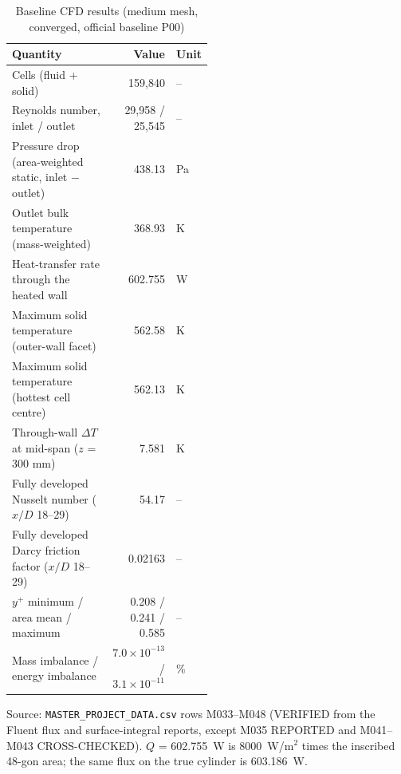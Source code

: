 \begin{table}[htbp]
\centering
\small
\caption{Baseline CFD results (medium mesh, converged, official baseline P00)}
\label{tab:cfdres}
\begin{tabular}{>{\raggedright\arraybackslash}p{0.50\linewidth}rl}
\toprule
Quantity & Value & Unit \\
\midrule
Cells (fluid + solid) & 159,840 & -- \\
Reynolds number, inlet / outlet & 29,958 / 25,545 & -- \\
Pressure drop (area-weighted static, inlet $-$ outlet) & 438.13 & Pa \\
Outlet bulk temperature (mass-weighted) & 368.93 & K \\
Heat-transfer rate through the heated wall & 602.755 & W \\
Maximum solid temperature (outer-wall facet) & 562.58 & K \\
Maximum solid temperature (hottest cell centre) & 562.13 & K \\
Through-wall $\Delta T$ at mid-span ($z$ = 300 mm) & 7.581 & K \\
Fully developed Nusselt number ($x/D$ 18--29) & 54.17 & -- \\
Fully developed Darcy friction factor ($x/D$ 18--29) & 0.02163 & -- \\
$y^+$ minimum / area mean / maximum & 0.208 / 0.241 / 0.585 & -- \\
Mass imbalance / energy imbalance & $7.0\times10^{-13}$ / $3.1\times10^{-11}$ & \% \\
\bottomrule
\end{tabular}
\par\smallskip\parbox{\linewidth}{\footnotesize\raggedright Source: \texttt{MASTER\_PROJECT\_DATA.csv} rows M033--M048 (VERIFIED from the Fluent flux and surface-integral reports, except M035 REPORTED and M041--M043 CROSS-CHECKED). $Q$ = 602.755~W is 8000~W/m$^2$ times the inscribed 48-gon area; the same flux on the true cylinder is 603.186~W.}
\end{table}
